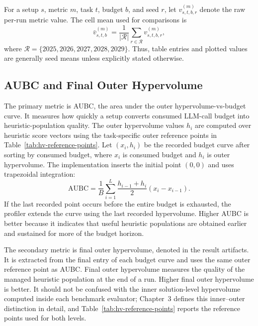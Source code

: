 For a setup $s$, metric $m$, task $t$, budget $b$, and seed $r$, let $v^{(m)}_{s,t,b,r}$ denote the raw per-run metric value. The cell mean used for comparisons is
\begin{equation}
  \bar{v}^{(m)}_{s,t,b}
  =
  \frac{1}{|\mathcal{R}|}
  \sum_{r\in\mathcal{R}} v^{(m)}_{s,t,b,r},
\end{equation}
where $\mathcal{R}=\{2025,2026,2027,2028,2029\}$. Thus, table entries and plotted values are generally seed means unless explicitly stated otherwise.

\subsection{AUBC and Final Outer Hypervolume}

The primary metric is AUBC, the area under the outer hypervolume-vs-budget curve. It measures how quickly a setup converts consumed LLM-call budget into heuristic-population quality. The outer hypervolume values $h_i$ are computed over heuristic score vectors using the task-specific outer reference points in Table~\ref{tab:hv-reference-points}. Let $(x_i,h_i)$ be the recorded budget curve after sorting by consumed budget, where $x_i$ is consumed budget and $h_i$ is outer hypervolume. The implementation inserts the initial point $(0,0)$ and uses trapezoidal integration:
\begin{equation}
  \mathrm{AUBC}
  =
  \frac{1}{B}
  \sum_{i=1}^{L}
  \frac{h_{i-1}+h_i}{2}
  (x_i-x_{i-1}).
  \label{eq:aubc-chapter5}
\end{equation}
If the last recorded point occurs before the entire budget is exhausted, the profiler extends the curve using the last recorded hypervolume. Higher AUBC is better because it indicates that useful heuristic populations are obtained earlier and sustained for more of the budget horizon.

The secondary metric is final outer hypervolume, denoted  in the result artifacts. It is extracted from the final  entry of each budget curve and uses the same outer reference point as AUBC. Final outer hypervolume measures the quality of the managed heuristic population at the end of a run. Higher final outer hypervolume is better. It should not be confused with the inner solution-level hypervolume computed inside each benchmark evaluator; Chapter~3 defines this inner--outer distinction in detail, and Table~\ref{tab:hv-reference-points} reports the reference points used for both levels.

